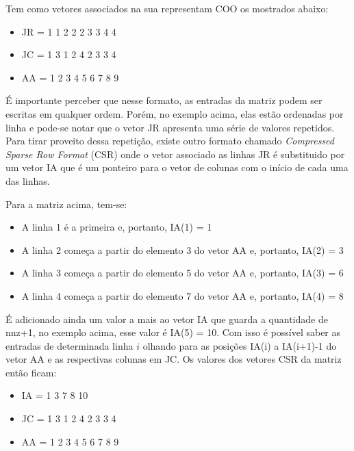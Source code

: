 Tem como vetores associados na sua representam COO os mostrados abaixo:


\begin{center}
    \begin{itemize}
        \item  JR = 1 1 2 2 2 3 3 4 4
        \item  JC = 1 3 1 2 4 2 3 3 4
        \item  AA = 1 2 3 4 5 6 7 8 9
    \end{itemize}
\end{center}


É importante perceber que nesse formato, as entradas da matriz podem ser escritas em qualquer ordem. Porém, no exemplo acima, elas estão ordenadas por linha e pode-se notar que o vetor JR apresenta uma série de valores repetidos. Para tirar proveito dessa repetição, existe outro formato chamado \textit{Compressed Sparse Row Format} (CSR) onde o vetor associado as linhas JR é substituido por um vetor IA que é um ponteiro para o vetor de colunas com o início de cada uma das linhas.

Para a matriz acima, tem-se:

\begin{itemize}
    \item A linha 1 é a primeira e, portanto, IA(1) = 1
    \item A linha 2 começa a partir do elemento 3 do vetor AA e, portanto, IA(2) = 3
    \item A linha 3 começa a partir do elemento 5 do vetor AA e, portanto, IA(3) = 6
    \item A linha 4 começa a partir do elemento 7 do vetor AA e, portanto, IA(4) = 8
\end{itemize}

É adicionado ainda um valor a mais ao vetor IA que guarda a quantidade de nnz+1, no exemplo acima, esse valor é IA(5) = 10. Com isso é possível saber as entradas de determinada linha $i$ olhando para as posições IA(i) a IA(i+1)-1 do vetor AA e as respectivas colunas em JC. Os valores dos vetores CSR da matriz então ficam:

\begin{center}
    \begin{itemize}
        \item IA = 1 3 7 8 10
        \item JC = 1 3 1 2 4 2 3 3 4
        \item AA = 1 2 3 4 5 6 7 8 9
    \end{itemize}
\end{center}


